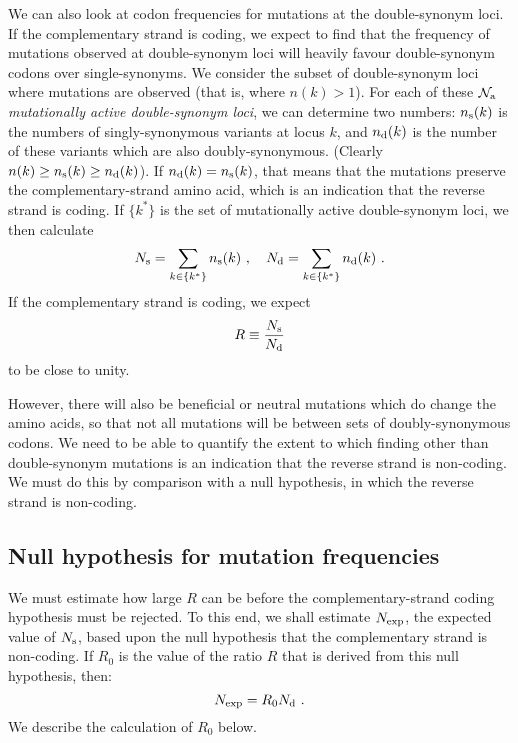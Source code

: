 \documentclass[9pt,lineno]{elife}
\newcommand{\MW}[1]{{\color{magenta}{#1}}}
\begin{document}
We can also look at codon frequencies for \MW{different} mutations at the double-synonym loci. 
If the complementary strand is coding, we expect to find that the frequency of mutations 
observed at double-synonym loci will heavily favour double-synonym codons over 
single-synonyms.  We consider the subset of double-synonym loci where mutations 
are observed (that is, where $n(k)>1$). For each of these ${\cal N}_{\rm a}$ \emph{mutationally 
active double-synonym loci}, we can determine two numbers: $n_{\rm s}(k)$ is 
the numbers of singly-synonymous variants at locus $k$, and $n_{\rm d}(k)$ is the number 
of these variants which are also doubly-synonymous. (Clearly $n(k)\ge n_{\rm s}(k)\ge n_{\rm d}(k)$). 
If $n_{\rm d}(k)=n_{\rm s}(k)$, that means that the mutations preserve the complementary-strand 
amino acid, which is an indication that the reverse strand is coding. If $\{k^\ast\}$ 
is the set of mutationally active double-synonym loci, we then
calculate
%
\begin{equation}
\label{eq: 3.2}
N_{\rm s}=\sum_{k\in\{k^\ast\}} n_{\rm s}(k)
\ ,\ \ \ 
N_{\rm d}=\sum_{k\in\{k^\ast\}} n_{\rm d}(k)
\ .
\end{equation}
%
If the complementary strand is coding, we expect 
%
\begin{equation}
\label{eq: 3.3}
R\equiv \frac{N_{\rm s}}{N_{\rm d}}
\end{equation}
%
to be close to unity.

However, there will also be beneficial 
or neutral mutations which do change the amino acids, so that not all mutations 
will be between sets of doubly-synonymous codons. We need to be able to 
quantify the extent to which finding other than double-synonym mutations is 
an indication that the reverse strand is non-coding. We must do this by comparison with 
a null hypothesis, in which the reverse strand is non-coding. 

\subsection{Null hypothesis for mutation frequencies}
\label{sec: 3.3}

We must estimate how large $R$ can be before the complementary-strand coding hypothesis must 
be rejected. To this end, we shall estimate $N_{\rm exp}$, the expected value of $N_{\rm s}$, 
based upon the null hypothesis that the complementary strand is non-coding. 
If $R_0$ is the value of the ratio $R$ that is derived from this null hypothesis, then: 
%
\begin{equation}
\label{eq: 3.4}
N_{\rm exp}=R_0 N_{\rm d}
\ .
\end{equation}
%
We describe the calculation of $R_0$ below. 
\end{document}
